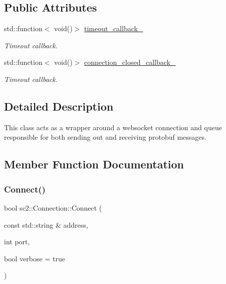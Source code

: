 \subsection*{Public Attributes}
\begin{DoxyCompactItemize}
\item 
\mbox{\label{classsc2_1_1_connection_abab9f14cde0fe589fc3a1c9588c6607a}} 
std\+::function$<$ void()$>$ \hyperlink{classsc2_1_1_connection_abab9f14cde0fe589fc3a1c9588c6607a}{timeout\+\_\+callback\+\_\+}
\begin{DoxyCompactList}\small\item\em Timeout callback. \end{DoxyCompactList}\item 
\mbox{\label{classsc2_1_1_connection_a4df89365bfaec33df14cf9a84f42c938}} 
std\+::function$<$ void()$>$ \hyperlink{classsc2_1_1_connection_a4df89365bfaec33df14cf9a84f42c938}{connection\+\_\+closed\+\_\+callback\+\_\+}
\begin{DoxyCompactList}\small\item\em Timeout callback. \end{DoxyCompactList}\end{DoxyCompactItemize}


\subsection{Detailed Description}
This class acts as a wrapper around a websocket connection and queue responsible for both sending out and receiving protobuf messages. 

\subsection{Member Function Documentation}
\mbox{\label{classsc2_1_1_connection_ae2b9a0a28789ac5c6304506cf0bea4b0}} 
\subsubsection{\texorpdfstring{Connect()}{Connect()}}
{\footnotesize\ttfamily bool sc2\+::\+Connection\+::\+Connect (\begin{DoxyParamCaption}\item[{const std\+::string \&}]{address,  }\item[{int}]{port,  }\item[{bool}]{verbose = {\ttfamily true} }\end{DoxyParamCaption})}

